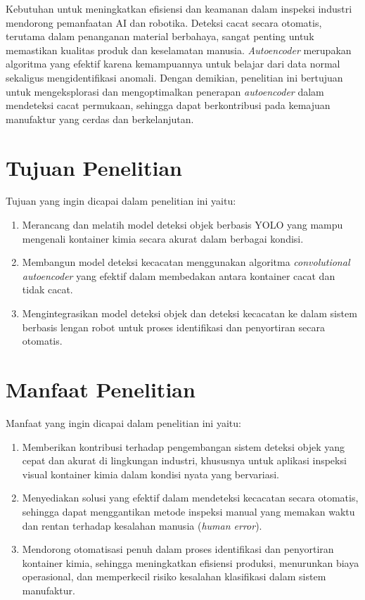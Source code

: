 Kebutuhan untuk meningkatkan efisiensi dan keamanan dalam inspeksi
industri mendorong pemanfaatan AI dan robotika. Deteksi cacat secara
otomatis, terutama dalam penanganan material berbahaya, sangat
penting untuk memastikan kualitas produk dan keselamatan manusia.
\textit{Autoencoder} merupakan algoritma yang efektif karena kemampuannya
untuk belajar dari data normal sekaligus mengidentifikasi anomali.
Dengan demikian, penelitian ini bertujuan untuk mengeksplorasi dan
mengoptimalkan penerapan \textit{autoencoder} dalam mendeteksi cacat
permukaan, sehingga dapat berkontribusi pada kemajuan manufaktur yang
cerdas dan berkelanjutan. \par

\vspace{1em}

\section{Tujuan Penelitian}
Tujuan yang ingin dicapai dalam penelitian ini yaitu:
\begin{enumerate}
  \item Merancang dan melatih model deteksi objek berbasis YOLO yang
    mampu mengenali kontainer kimia secara akurat dalam berbagai kondisi.
  \item Membangun model deteksi kecacatan menggunakan algoritma
    \textit{convolutional autoencoder} yang efektif dalam membedakan antara
    kontainer cacat dan tidak cacat.
  \item Mengintegrasikan model deteksi objek dan deteksi kecacatan ke
    dalam sistem berbasis lengan robot untuk proses identifikasi dan
    penyortiran secara otomatis.
\end{enumerate}

\vspace{1em}

\section{Manfaat Penelitian}
Manfaat yang ingin dicapai dalam penelitian ini yaitu:
\begin{enumerate}
  \item Memberikan kontribusi terhadap pengembangan sistem deteksi
    objek yang cepat dan akurat di lingkungan industri, khususnya
    untuk aplikasi inspeksi visual kontainer kimia dalam kondisi
    nyata yang bervariasi.
  \item Menyediakan solusi yang efektif dalam mendeteksi kecacatan secara
    otomatis, sehingga dapat menggantikan metode inspeksi manual yang
    memakan waktu dan rentan terhadap kesalahan manusia (\textit{human error}).
  \item Mendorong otomatisasi penuh dalam proses identifikasi dan
    penyortiran kontainer kimia, sehingga meningkatkan efisiensi
    produksi, menurunkan biaya operasional, dan memperkecil risiko
    kesalahan klasifikasi dalam sistem manufaktur.
\end{enumerate}
